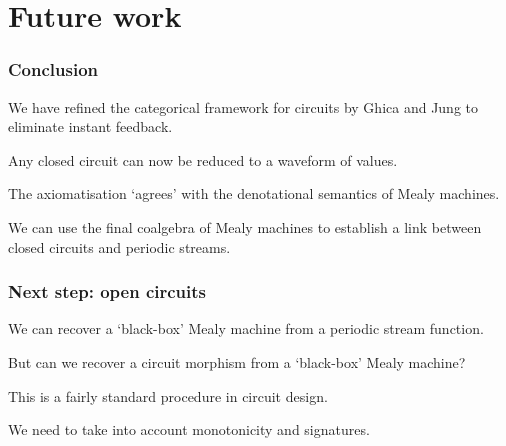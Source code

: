 \section{Future work}

\begin{frame}
    \frametitle{Conclusion}

    We have refined the \alert{categorical framework} for circuits by Ghica and Jung to eliminate \alert{instant feedback}.

    \pause

    Any closed circuit can now be reduced to a \alert{waveform} of values. 

    \pause

    The axiomatisation `agrees' with the denotational semantics of \alert{Mealy machines}.

    \pause

    We can use the \alert{final coalgebra} of Mealy machines to establish a link between \alert{closed circuits} and \alert{periodic streams}.

\end{frame}

\begin{frame}
    \frametitle{Next step: open circuits}

    We can recover a `black-box' Mealy machine from a periodic stream function. 

    \pause

    But can we recover a circuit morphism from a `black-box' Mealy machine?

    \pause

    This is a fairly standard procedure in circuit design.

    \pause

    We need to take into account \alert{monotonicity} and \alert{signatures}.

\end{frame}